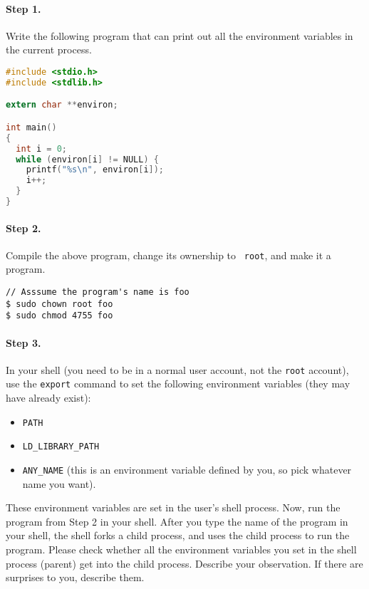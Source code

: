 \paragraph{Step 1.} Write the following program that can print out all
the environment variables in the current process.

\begin{lstlisting}[language=C]
#include <stdio.h>
#include <stdlib.h>

extern char **environ;

int main()
{
  int i = 0;
  while (environ[i] != NULL) {
    printf("%s\n", environ[i]);
    i++;
  }
}
\end{lstlisting}


\paragraph{Step 2.} Compile the above program, change its ownership to {\tt
root}, and make it a \setuid program.

\begin{lstlisting}
// Asssume the program's name is foo
$ sudo chown root foo
$ sudo chmod 4755 foo
\end{lstlisting}



\paragraph{Step 3.} In your shell (you need to be in a normal user account,
not the {\tt root} account), use the {\tt export} command to set the
following environment variables (they may have already exist):

\begin{itemize}[noitemsep]
\item {\tt PATH}
\item {\tt LD\_LIBRARY\_PATH}
\item {\tt ANY\_NAME} (this is an environment variable defined by you, so
pick whatever name you want).
\end{itemize}


These environment variables are set in the user's shell process.
Now, run the \setuid program from Step 2 in your shell. After you type the
name of the program in your shell, the shell forks a child process,
and uses the child process to run the program. Please check whether all the
environment variables you set in the shell process (parent) get into
the \setuid child process.  Describe your observation. If there are
surprises to you, describe them.



